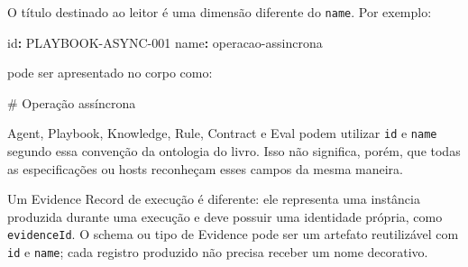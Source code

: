 \documentclass[
  10pt,
  a4paper,
  oneside]{book}
\newenvironment{Shaded}{}{}
\newcommand{\AttributeTok}[1]{\textcolor[rgb]{0.49,0.56,0.16}{#1}}
\newcommand{\FunctionTok}[1]{\textcolor[rgb]{0.02,0.16,0.49}{#1}}
\newcommand{\KeywordTok}[1]{\textcolor[rgb]{0.00,0.44,0.13}{\textbf{#1}}}
\renewenvironment{Shaded}{\begin{snugshade}}{\end{snugshade}}%
\begin{document}
O título destinado ao leitor é uma dimensão diferente do \texttt{name}.
Por exemplo:

\begin{Shaded}
\begin{Highlighting}[]
\FunctionTok{id}\KeywordTok{:}\AttributeTok{ PLAYBOOK{-}ASYNC{-}001}
\FunctionTok{name}\KeywordTok{:}\AttributeTok{ operacao{-}assincrona}
\end{Highlighting}
\end{Shaded}

pode ser apresentado no corpo como:

\begin{Shaded}
\begin{Highlighting}[]
\FunctionTok{\# Operação assíncrona}
\end{Highlighting}
\end{Shaded}

Agent, Playbook, Knowledge, Rule, Contract e Eval podem utilizar
\texttt{id} e \texttt{name} segundo essa convenção da ontologia do
livro. Isso não significa, porém, que todas as especificações ou hosts
reconheçam esses campos da mesma maneira.

Um Evidence Record de execução é diferente: ele representa uma instância
produzida durante uma execução e deve possuir uma identidade própria,
como \texttt{evidenceId}. O schema ou tipo de Evidence pode ser um
artefato reutilizável com \texttt{id} e \texttt{name}; cada registro
produzido não precisa receber um nome decorativo.
\end{document}
